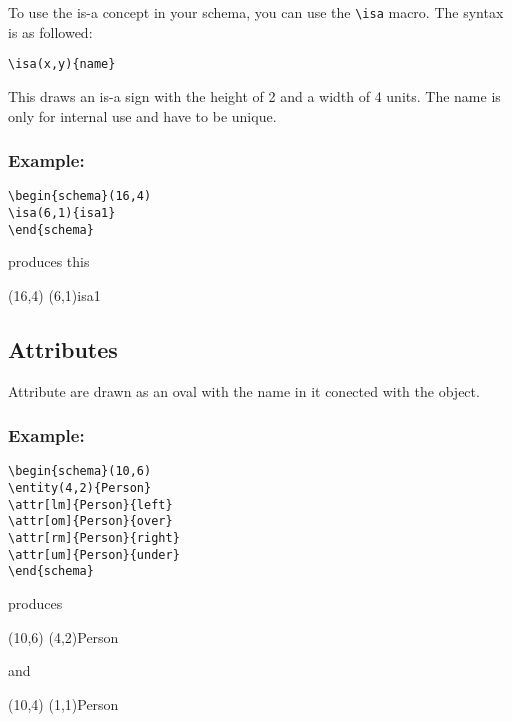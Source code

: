 \documentclass[a4paper,11pt]{article}
\begin{document}
To use the is-a concept in your schema, you can use the \verb|\isa| macro.
The syntax is as followed:

\begin{verbatim}
\isa(x,y){name}
\end{verbatim}

This draws an is-a sign with the height of 2 and a width of 4 units.
The name is only for internal use and have to be unique.

\subsubsection*{Example:}

\begin{verbatim}
\begin{schema}(16,4)
\isa(6,1){isa1}
\end{schema}
\end{verbatim}

produces this

\begin{schema}(16,4)
\isa(6,1){isa1}
\end{schema}

\subsection{Attributes}

Attribute are drawn as an oval with the name in it conected with the object.

\subsubsection*{Example:}

\begin{verbatim}
\begin{schema}(10,6)
\entity(4,2){Person}
\attr[lm]{Person}{left}
\attr[om]{Person}{over}
\attr[rm]{Person}{right}
\attr[um]{Person}{under}
\end{schema}
\end{verbatim}

produces

\begin{schema}(10,6)
\entity(4,2){Person}
\end{schema}

and

\begin{schema}(10,4)
\entity(1,1){Person}
\end{schema}
\end{document}
